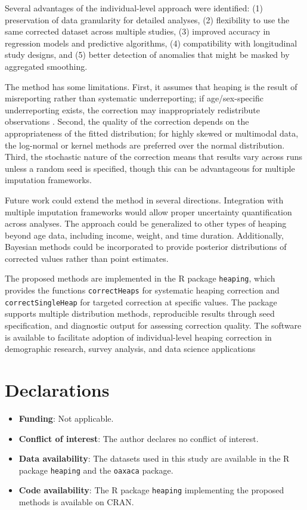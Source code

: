 \documentclass[pdflatex,sn-mathphys-num]{sn-jnl}%
\theoremstyle{thmstyleone}%
\theoremstyle{thmstyletwo}%
\theoremstyle{thmstylethree}%
\begin{document}
Several advantages of the individual-level approach were identified: (1) preservation of data granularity for detailed analyses, (2) flexibility to use the same corrected dataset across multiple studies, (3) improved accuracy in regression models and predictive algorithms, (4) compatibility with longitudinal study designs, and (5) better detection of anomalies that might be masked by aggregated smoothing.

The method has some limitations. First, it assumes that heaping is the result of misreporting rather than systematic underreporting; if age/sex-specific underreporting exists, the correction may inappropriately redistribute observations \citep{preston1999}. Second, the quality of the correction depends on the appropriateness of the fitted distribution; for highly skewed or multimodal data, the log-normal or kernel methods are preferred over the normal distribution. Third, the stochastic nature of the correction means that results vary across runs unless a random seed is specified, though this can be advantageous for multiple imputation frameworks.

Future work could extend the method in several directions. Integration with multiple imputation frameworks would allow proper uncertainty quantification across analyses. The approach could be generalized to other types of heaping beyond age data, including income, weight, and time duration. Additionally, Bayesian methods could be incorporated to provide posterior distributions of corrected values rather than point estimates.

The proposed methods are implemented in the R package \texttt{heaping}, which provides the functions \texttt{correctHeaps} for systematic heaping correction and \texttt{correctSingleHeap} for targeted correction at specific values. The package supports multiple distribution methods, reproducible results through seed specification, and diagnostic output for assessing correction quality. The software is available to facilitate adoption of individual-level heaping correction in demographic research, survey analysis, and data science applications


\section*{Declarations}

\begin{itemize}
\item \textbf{Funding}: Not applicable.
\item \textbf{Conflict of interest}: The author declares no conflict of interest.
\item \textbf{Data availability}: The datasets used in this study are available in the R package \texttt{heaping} and the \texttt{oaxaca} package.
\item \textbf{Code availability}: The R package \texttt{heaping} implementing the proposed methods is available on CRAN.
\end{itemize}


\end{document}
